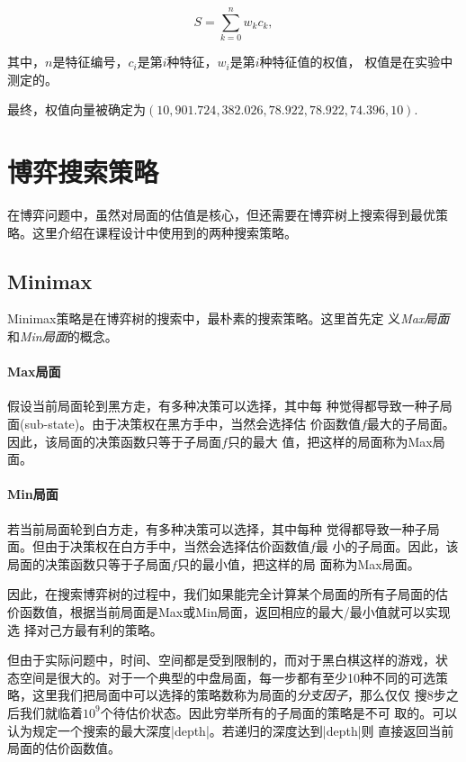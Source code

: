 \documentclass[oneside,a4paper]{article}
\begin{document}
\begin{equation}
  S = \sum_{k=0}^nw_kc_k \mathrm{ ,}
\end{equation}

其中，$n$是特征编号，$c_i$是第$i$种特征，$w_i$是第$i$种特征值的权值，
权值是在实验中测定的。

最终，权值向量被确定为$(10, 901.724, 382.026, 78.922, 78.922, 74.396,
10)$.

\section{博弈搜索策略}
\label{sec:gaming}

在博弈问题中，虽然对局面的估值是核心，但还需要在博弈树上搜索得到最优策
略。这里介绍在课程设计中使用到的两种搜索策略。

\subsection{Minimax}
\label{sec:minimax}

Minimax策略是在博弈树的搜索中，最朴素的搜索策略。这里首先定
义\emph{Max局面}和\emph{Min局面}的概念。

\paragraph{Max局面} 假设当前局面轮到黑方走，有多种决策可以选择，其中每
种觉得都导致一种子局面(sub-state)。由于决策权在黑方手中，当然会选择估
价函数值$f$最大的子局面。因此，该局面的决策函数只等于子局面$f$只的最大
值，把这样的局面称为Max局面。


\paragraph{Min局面} 若当前局面轮到白方走，有多种决策可以选择，其中每种
觉得都导致一种子局面。但由于决策权在白方手中，当然会选择估价函数值$f$最
小的子局面。因此，该局面的决策函数只等于子局面$f$只的最小值，把这样的局
面称为Max局面。

因此，在搜索博弈树的过程中，我们如果能完全计算某个局面的所有子局面的估
价函数值，根据当前局面是Max或Min局面，返回相应的最大/最小值就可以实现选
择对己方最有利的策略。

但由于实际问题中，时间、空间都是受到限制的，而对于黑白棋这样的游戏，状
态空间是很大的。对于一个典型的中盘局面，每一步都有至少10种不同的可选策
略，这里我们把局面中可以选择的策略数称为局面的\emph{分支因子}，那么仅仅
搜8步之后我们就临着$10^9$个待估价状态。因此穷举所有的子局面的策略是不可
取的。可以认为规定一个搜索的最大深度|depth|。若递归的深度达到|depth|则
直接返回当前局面的估价函数值。
\end{document}
